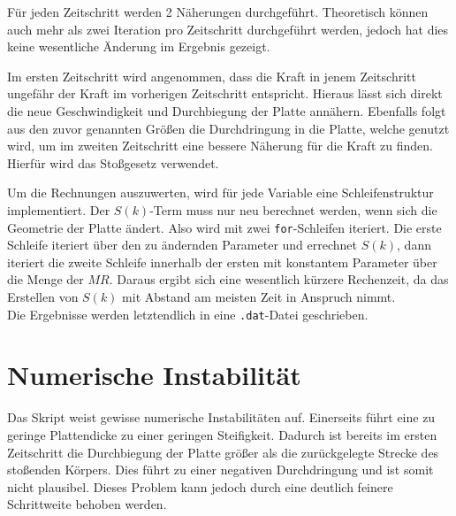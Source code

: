 Für jeden Zeitschritt werden 2 Näherungen durchgeführt. Theoretisch können auch mehr als zwei Iteration pro Zeitschritt durchgeführt werden, jedoch hat dies keine wesentliche Änderung im Ergebnis gezeigt.

Im ersten Zeitschritt wird angenommen, dass die Kraft in jenem Zeitschritt ungefähr der Kraft im vorherigen Zeitschritt entspricht. Hieraus lässt sich direkt die neue Geschwindigkeit und Durchbiegung der Platte annähern. Ebenfalls folgt aus den zuvor genannten Größen die Durchdringung in die Platte, welche genutzt wird, um im zweiten Zeitschritt eine bessere Näherung für die Kraft zu finden. Hierfür wird das Stoßgesetz verwendet.

Um die Rechnungen auszuwerten, wird für jede Variable eine Schleifenstruktur implementiert. Der $S(k)$-Term muss nur neu berechnet werden, wenn sich die Geometrie der Platte ändert. Also wird mit zwei \texttt{for}-Schleifen iteriert. Die erste Schleife iteriert über den zu ändernden Parameter und errechnet $S(k)$, dann iteriert die zweite Schleife innerhalb der ersten mit konstantem Parameter über die Menge der $MR$.  Daraus ergibt sich eine wesentlich kürzere Rechenzeit, da das Erstellen von $S(k)$ mit Abstand am meisten Zeit in Anspruch nimmt. \\
Die Ergebnisse werden letztendlich in eine \texttt{.dat}-Datei geschrieben. 


\section*{Numerische Instabilität}

Das Skript weist gewisse numerische Instabilitäten auf. Einerseits führt eine zu geringe Plattendicke zu einer geringen Steifigkeit. Dadurch ist bereits im ersten Zeitschritt die Durchbiegung der Platte größer als die zurückgelegte Strecke des stoßenden Körpers. Dies führt zu einer negativen Durchdringung und ist somit nicht plausibel. Dieses Problem kann jedoch durch eine deutlich feinere Schrittweite behoben werden.






